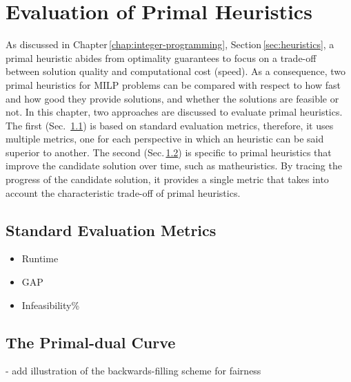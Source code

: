 

\chapter{Evaluation of Primal Heuristics}\label{chap:evaluation}

As discussed in Chapter\,\ref{chap:integer-programming}, Section\,\ref{sec:heuristics}, a primal heuristic abides from optimality guarantees to focus on a trade-off between solution quality and computational cost (speed).
As a consequence, two primal heuristics for MILP problems can be compared with respect to how fast and how good they provide solutions, and whether the solutions are feasible or not.
In this chapter, two approaches are discussed to evaluate primal heuristics.
The first (Sec.~\ref{sec:standard-evaluation-metrics}) is based on standard evaluation metrics, therefore, it uses multiple metrics, one for each perspective in which an heuristic can be said superior to another.
The second (Sec.\,\ref{sec:primal-dual-curve}) is specific to primal heuristics that improve the candidate solution over time, such as matheuristics.
By tracing the progress of the candidate solution, it provides a single metric that takes into account the characteristic trade-off of primal heuristics.


\section{Standard Evaluation Metrics}\label{sec:standard-evaluation-metrics}

\begin{itemize}
    \item Runtime
    \item GAP
    \item Infeasibility\%
\end{itemize}

\section{The Primal-dual Curve}\label{sec:primal-dual-curve}


- add illustration of the backwards-filling scheme for fairness

